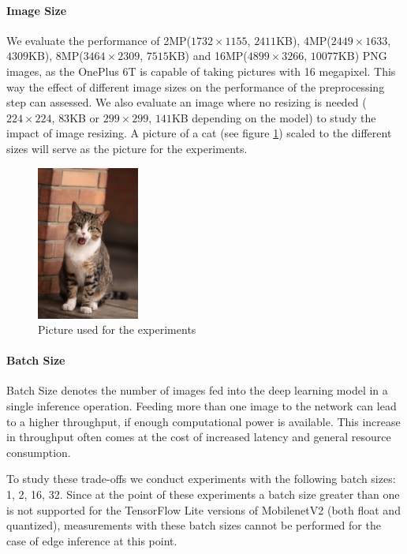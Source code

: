 \paragraph{Image Size}
We evaluate the performance of 2MP($1732\times1155$, $2411$KB), 4MP($2449\times1633$, $4309$KB), 8MP($3464\times2309$, $7515$KB) and 16MP($4899\times3266$, $10077$KB) PNG images, as the OnePlus 6T is capable of taking pictures with 16 megapixel. This way the effect of different image sizes on the performance of the preprocessing step can assessed. We also evaluate an image where no resizing is needed ($224\times224$, $83$KB or $299\times299$, $141$KB depending on the model) to study the impact of image resizing. A picture of a cat (see figure \ref{fig:cat}) scaled to the different sizes will serve as the picture for the experiments.
\begin{figure}[H]
\centering
\includegraphics[width=0.3\textwidth]{./Bilder/European_cat_02_16_mp.jpg}
\caption{Picture used for the experiments \cite{cat}}
\label{fig:cat}
\end{figure}
\paragraph{Batch Size}
Batch Size denotes the number of images fed into the deep learning model in a single inference operation. 
Feeding more than one image to the network can lead to a higher throughput, if enough computational power is available. This increase in throughput often comes at the cost of increased latency and general resource consumption.

To study these trade-offs we conduct experiments with the following batch sizes: 1, 2, 16, 32. Since at the point of these experiments a batch size greater than one is not supported for the TensorFlow Lite versions of MobilenetV2 (both float and quantized), measurements with these batch sizes cannot be performed for the case of edge inference at this point.
